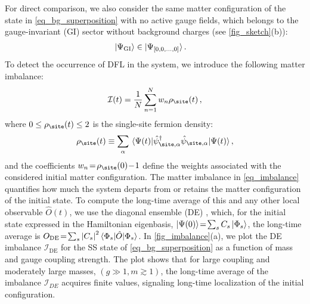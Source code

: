 \documentclass[aps,prl,reprint,twocolumn,superscriptaddress,floatfix,nofootinbib]{revtex4-2}
\begin{document}
For direct comparison, we also consider the same matter configuration of the state in \cref{eq_bg_superposition} with no active gauge fields, which belongs to the gauge-invariant (GI) sector without background charges (see \cref{fig_sketch}(b)):
\begin{equation}
    \begin{split}
        \ket{\Psi_{\rm{GI}}} &
        \in\ket{\Psi_{\qty[0,0,\dots, 0]}}.
    \end{split}
    \label{eq_2siteDW}
\end{equation}
To detect the occurrence of DFL in the system, we introduce the following matter imbalance:
\begin{equation}
    \mathcal{I}(t)=\frac{1}{N}\sum_{n=1}^{N}w_n\rho_{\site}(t)\,,
    \label{eq_imbalance}
\end{equation}
where $0\leq \rho_{\site}(t)\leq 2$ is the single-site fermion density:
\begin{equation}
    \rho_{\site}(t)\equiv\sum_{\alpha}\mel{\Psi(t)}{\hat{\psi}_{\site,\alpha}^{\dagger}\hat{\psi}_{\site,\alpha}}{\Psi(t)},
\end{equation}
and the coefficients $w_n\!=\!\rho_{\site}(0)\!-\!1$ define the weights associated with the considered initial matter configuration.
The matter imbalance in \cref{eq_imbalance} quantifies how much the system departs from or retains the matter configuration of the initial state.
To compute the long-time average of this and any other local observable $\hat{O}(t)$, we use the diagonal ensemble (DE) \cite{Rigol2008ThermalizationItsMechanism, SM}, which, for the initial state expressed in the Hamiltonian eigenbasis, $\ket{\Psi(0)}\!=\!\sum_{s}C_{s}\ket{\Phi_{s}}$, the long-time average is  $O_{\mathrm{DE}}\!=\!\sum_{s}\abs{C_{s}}^2 \braket{\Phi_s|\hat O|\Phi_s}$.
In \cref{fig_imbalance}(a), we plot the DE imbalance $\mathcal{I}_{\mathrm{DE}}$ for the SS state of \cref{eq_bg_superposition} as a function of mass and gauge coupling strength.
The plot shows that for large coupling and moderately large masses, $(g\!\gg\!1, m\!\gtrsim\!1)$, the long-time average of the imbalance $\mathcal{I}_{DE}$ acquires finite values, signaling long-time localization of the initial configuration.
\end{document}

